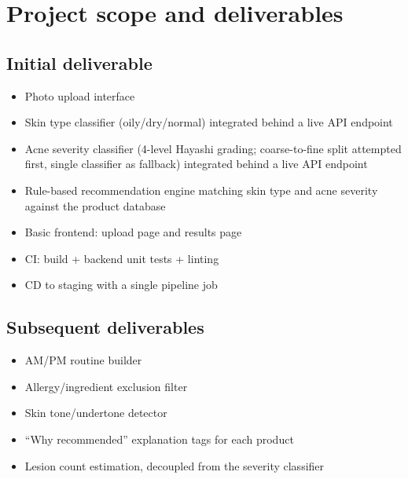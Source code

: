 \documentclass[11pt,a4paper]{article}
\begin{document}
\section{Project scope and deliverables}
\subsection{Initial deliverable}
\begin{itemize}[leftmargin=0.7cm]
    \item Photo upload interface
    \item Skin type classifier (oily/dry/normal) integrated behind a live API endpoint
    \item Acne severity classifier (4-level Hayashi grading; coarse-to-fine split attempted first, single classifier as fallback) integrated behind a live API endpoint
    \item Rule-based recommendation engine matching skin type and acne severity against the product database
    \item Basic frontend: upload page and results page
    \item CI: build + backend unit tests + linting
    \item CD to staging with a single pipeline job
\end{itemize}

\subsection{Subsequent deliverables}
\begin{itemize}[leftmargin=0.7cm]
    \item AM/PM routine builder
    \item Allergy/ingredient exclusion filter
    \item Skin tone/undertone detector
    \item ``Why recommended'' explanation tags for each product
    \item Lesion count estimation, decoupled from the severity classifier
\end{itemize}
\end{document}
